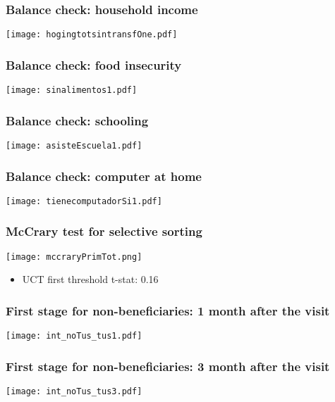 \documentclass{beamer}
\begin{document}
\begin{frame}
\frametitle{Balance check: household income}
\begin{center}
	\texttt{[image: hogingtotsintransfOne.pdf]} 
	\label{hogingtotsintransfOne}
\end{center}
\end{frame}

\begin{frame}
\frametitle{Balance check: food insecurity}
\begin{center}
	\texttt{[image: sinalimentos1.pdf]} 
	\label{sinalimentos1}
\end{center}
\end{frame}

\begin{frame}
\frametitle{Balance check: schooling}
\begin{center}
	\texttt{[image: asisteEscuela1.pdf]} 
	\label{asisteEscuela1}
\end{center}
\end{frame}

\begin{frame}
\frametitle{Balance check: computer at home}
\begin{center}
	\texttt{[image: tienecomputadorSi1.pdf]} 
	\label{tienecomputadorSi1}
\end{center}
\end{frame}

\begin{frame}
\frametitle{McCrary test for selective sorting}
\begin{center}
	\texttt{[image: mccraryPrimTot.png]} 
	\label{mccrary}
\end{center}
\begin{itemize}
	\item UCT first threshold t-stat: 0.16
\end{itemize}
\end{frame}

\begin{frame}
\frametitle{First stage for non-beneficiaries: 1 month after the visit}
\begin{center}
	\texttt{[image: int\_noTus\_tus1.pdf]}
	\label{int_noTus_tus1}
\end{center}
\end{frame}

\begin{frame}
\frametitle{First stage for non-beneficiaries: 3 month after the visit}
\begin{center}
\texttt{[image: int\_noTus\_tus3.pdf]}
\label{int_noTus_tus3}
\end{center}
\end{frame}
\end{document}
